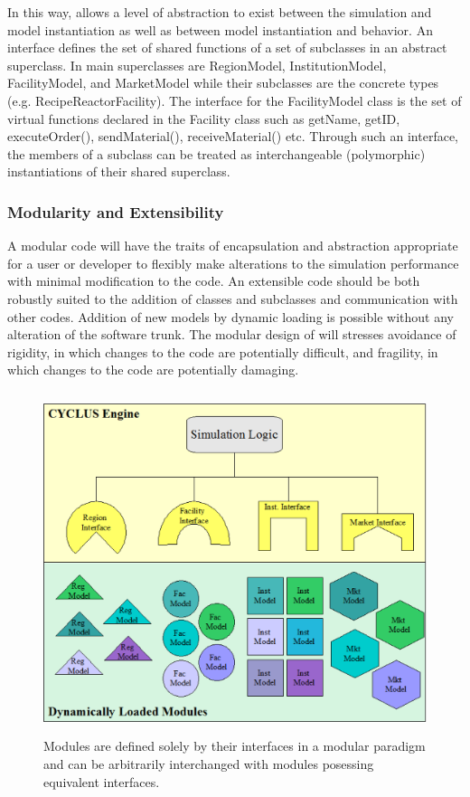 In this way, \Cyclus allows a level of abstraction to exist between 
the simulation and model instantiation 
as well as between model instantiation and behavior.
An interface defines the set of shared functions of a set of 
subclasses in an abstract superclass. In \Cyclus main superclasses are 
RegionModel, InstitutionModel, FacilityModel, and MarketModel while 
their subclasses are the concrete types (e.g. RecipeReactorFacility). 
The interface for the FacilityModel class is the set of 
virtual functions declared in the Facility class such as getName, 
getID, executeOrder(), sendMaterial(), receiveMaterial() etc.  Through 
such an interface, the members of a subclass can be treated as 
interchangeable (polymorphic) instantiations of their shared 
superclass. 

\subsubsection{Modularity and Extensibility}

A modular code will have the traits of encapsulation and abstraction 
appropriate for a user or developer to flexibly make alterations to 
the simulation performance with minimal modification to the code. An 
extensible code should be both robustly suited to the addition of 
classes and subclasses and communication with other codes. Addition of 
new models by dynamic loading is possible without any alteration of 
the software trunk. The modular design of \Cyclus will stresses avoidance of rigidity, in 
which changes to the code are potentially difficult, and fragility, in 
which changes to the code are potentially damaging.

\begin{figure}[htbp!]
  \begin{center}
    \includegraphics[height=10cm]{./chapters/paradigm/modularity.png}
  \end{center}
  \caption[Module Interfaces and Encapsulation]{Modules are defined solely 
  by their interfaces in a modular paradigm and can be arbitrarily 
  interchanged with modules posessing equivalent interfaces.}
  \label{fig:modularity}
\end{figure}

